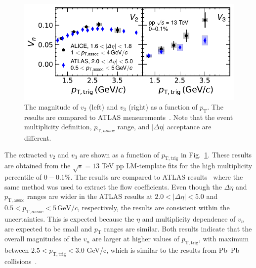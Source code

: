 \begin{figure}[h!]
	\centering
	\includegraphics[width=0.9 \textwidth]{figures/Fig2_vn.pdf} 
	\caption{The magnitude of $v_2$ (left) and $v_3$ (right) as a function of $p_\mathrm{T}$. The results are compared to ATLAS measurements~\cite{Aaboud:2016yar}. Note that the event multiplicity definition, $p_{\mathrm{T},assoc}$ range, and $|\Delta\eta|$ acceptance are different.}
	\label{fig:vn}
\end{figure}

The extracted $v_2$ and $v_3$ are shown as a function of $p_{\mathrm{T},\mathrm{trig}}$ in Fig.~\ref{fig:vn}. These results are obtained from the $\sqrt{s}=13$ TeV pp LM-template fits for the high multiplicity percentile of $0-0.1\%$. The results are compared to ATLAS results~\cite{Aaboud:2016yar} where the same method was used to extract the flow coefficients. Even though the $\Delta\eta$ and $p_{\mathrm{T},\mathrm{assoc}}$ ranges are wider in the ATLAS results at $2.0<|\Delta\eta|<5.0$ and $0.5<p_{\mathrm{T},assoc}<5\,\mathrm{GeV}/c$, respectively, the results are consistent within the uncertainties. This is expected because the $\eta$ and multiplicity dependence of $v_n$ are expected to be small and $p_{\mathrm{T}}$ ranges are similar. Both results indicate that the overall magnitudes of the $v_n$ are larger at higher values of $p_{\mathrm{T},\mathrm{trig}}$, with maximum between $2.5<p_{\mathrm{T},\mathrm{trig}}<3.0$ GeV/c, which is similar to the results from Pb--Pb collisions~\cite{ALICE:2018yph}.



